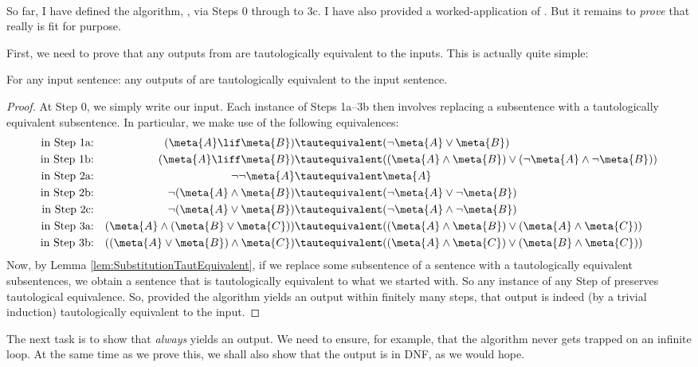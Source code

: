 \
\\So far, I have defined the algorithm, \intoDNF, via Steps 0 through to 3c. I have also provided a worked-application of \intoDNF. But it remains to \emph{prove} that \intoDNF{} really is fit for purpose. 

First, we need to prove that any outputs from \intoDNF{} are tautologically equivalent to the inputs. This is actually quite simple:
\begin{lem}\label{lem:IntoDNFEquivalent}
	For any input sentence: any outputs of \intoDNF{} are tautologically equivalent to the input sentence.
	\begin{proof}
		At Step 0, we simply write our input. Each instance of Steps 1a--3b then involves replacing a subsentence with a tautologically equivalent subsentence. In particular, we make use of the following equivalences:
	\begin{align*}
		\text{in Step 1a:} & & (\meta{A} \lif \meta{B}) &\tautequivalent (\lnot \meta{A} \lor \meta{B})\\
		\text{in Step 1b:} & & (\meta{A} \liff \meta{B}) &\tautequivalent ((\meta{A} \land \meta{B}) \lor (\lnot \meta{A} \land \lnot\meta{B}))\\
		\text{in Step 2a:} & & \lnot \lnot \meta{A} &\tautequivalent \meta{A}\\
		\text{in Step 2b:} & & \lnot (\meta{A} \land \meta{B})&\tautequivalent(\lnot \meta{A} \lor \lnot \meta{B})\\
		\text{in Step 2c:} & & \lnot (\meta{A} \lor \meta{B}) &\tautequivalent (\lnot \meta{A} \land \lnot \meta{B})\\
		\text{in Step 3a:} & & 		(\meta{A} \land (\meta{B} \lor \meta{C})) &\tautequivalent ((\meta{A} \land \meta{B}) \lor (\meta{A} \land \meta{C}))\\
		\text{in Step 3b:} & & ((\meta{A} \lor \meta{B}) \land \meta{C}) &\tautequivalent ((\meta{A} \land \meta{C}) \lor (\meta{B} \land \meta{C}))
		\end{align*}
	Now, by Lemma \ref{lem:SubstitutionTautEquivalent}, if we replace some subsentence of a sentence with a tautologically equivalent subsentences, we obtain a sentence that is tautologically equivalent to what we started with. So any instance of any Step of \intoDNF{} preserves tautological equivalence. So, provided the algorithm yields an output within finitely many steps, that output is indeed (by a trivial induction) tautologically equivalent to the input.
	\end{proof}
\end{lem}\noindent
The next task is to show that \intoDNF{} \emph{always} yields an output. We need to ensure, for example, that the algorithm never gets trapped on an infinite loop. At the same time as we prove this, we shall also show that the output is in DNF, as we would hope. 


